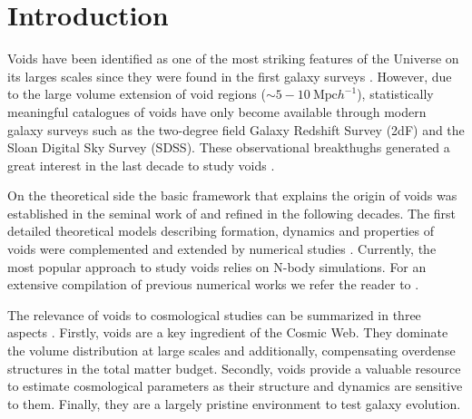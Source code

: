 \documentclass[a4,useAMS,usenatbib,usegraphicx]{latex/mn2e}
\begin{document}
\section{Introduction}
\label{sec:introduction}

Voids have been identified as one of the most striking features of the
Universe on its larges scales since they were found in the first
galaxy surveys \citep{Chincarini75, Gregory78, Einasto80M, Einasto80N,
  Kirshner81, Zeldovich82,Kirshner87}.  
However, due to the large volume extension of void regions ($\sim
5-10\ \mbox{Mpc}  h^{-1}$), statistically meaningful catalogues of
voids \citep{Pan10,  Sutter12b, Nadathur14} have only become available
through modern galaxy surveys such as the two-degree field Galaxy
Redshift Survey (2dF) \citep{ Colless01, Colless03} and the Sloan
Digital Sky Survey (SDSS)\citep{York00, Abazajian03}.
These observational breakthughs generated a great interest in the last
decade to study voids \citep{Hoyle04, Croton04, Rojas05,
  Ceccarelli06, Patiri06a, Tikhonov06, Patiri06b,Tikhonov07,
  BendaBeckmann08, Foster09, Ceccarelli13, Sutter14a}. 


On the theoretical side the basic framework that explains
the origin of voids was established in the seminal work of
\citet{Zeldovich70} and refined in the following decades.  
The first detailed theoretical models describing formation, dynamics
and properties of  voids \citep{Hoffman82, Icke84, Bertschinger85,
  Blumenthal92} were  complemented and extended by numerical studies
\citep{Martel90, Regos91, Weygaert93, Dubinski93, Bond96}. 
Currently, the most popular approach to study voids relies on N-body
simulations. For an extensive compilation of previous  
numerical works we refer the reader to \citet{Colberg08}.


The relevance of voids to cosmological studies can be summarized in
three aspects \citep{Platen07}. 
Firstly, voids are a key ingredient of the Cosmic Web. 
They dominate the volume distribution at large scales and
additionally, compensating overdense structures in the total matter
budget. 
Secondly, voids provide a valuable resource to estimate  
cosmological parameters as their structure and dynamics are sensitive
to them. 
Finally, they are a largely pristine environment to test galaxy
evolution. 
\end{document}
